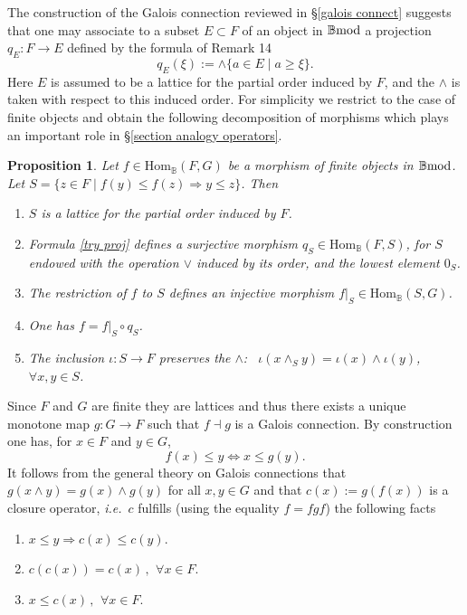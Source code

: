 \documentclass[12pt]{article}
\newtheorem{prop}[thm]{Proposition}
\def\Hom{{\rm Hom}}
\def\B{{\mathbb B}}
\def\qqq{\,,\,~\forall}
\newcommand{\ie}{{\it i.e.\/}\ }
\def\Hom {{\mbox{Hom}}}
\def\bmod{{\rm \B mod}}
\begin{document}
The construction of the Galois connection reviewed  in \S\ref{galois connect} suggests that one may associate to a subset $E\subset F$ of an object in $\bmod$ a projection $q_E:F\to E$ defined by the formula of \cite{Cohen} Remark 14
  \begin{equation}\label{try proj}
  	 q_E(\xi):=\wedge \{a\in E\mid a\geq \xi\}.
  \end{equation}
  Here $E$ is assumed to be a lattice for the  partial order induced by $F$, and the $\wedge$ is taken with respect to this induced order.  For simplicity we restrict to the case of finite objects and obtain the following decomposition of morphisms which plays an important role in \S\ref{section analogy operators}.
  \begin{prop}\label{support} Let $f\in \Hom_\B(F,G)$ be a morphism of finite objects in $\bmod$. Let $S=\{z\in F\mid f(y)\leq f(z)\Rightarrow y\leq z\}$. Then 
  \begin{enumerate}
  \item $S$ is a lattice for the partial order induced by $F$.
  \item Formula \eqref{try proj} defines a surjective morphism $q_S\in \Hom_\B(F,S)$, for $S$ endowed with the operation $\vee$ induced by its order, and the lowest element $0_S$.
  \item The restriction of $f$ to $S$ defines an injective morphism $f\vert_S\in \Hom_\B(S,G)$.
  \item One has $f=f\vert_S\circ q_S$.
  \item The inclusion $\iota:S\to F$ preserves the $\wedge$:~ $\iota(x\wedge_S y)=\iota(x)\wedge \iota(y)$, $\forall x,y \in S$.  	
  \end{enumerate}  	
  \end{prop}
    \proof Since $F$ and $G$ are finite they are lattices and thus there exists a unique monotone map $g:G\to F$ such that $f\dashv g$ is a Galois connection. By construction one has, for $x\in F$ and $y\in G$,
    \begin{equation}\label{galconnect}
  	 f(x)\leq y\iff x\leq g(y).
  \end{equation} 
It follows from the general theory on Galois connections that $g(x\wedge y)=g(x)\wedge g(y)$ for all $x,y\in G$ and that  $c(x):=g(f(x))$ is a closure operator, \ie $c$ fulfills (using the equality $f=fgf$) the following facts
\begin{enumerate}
  \item $x\leq y\Rightarrow c(x)\leq c(y)$.
  \item $c(c(x))=c(x)\qqq x\in F$.
  \item $x\leq c(x) \qqq x\in F$.  	
  \end{enumerate}
\end{document}
